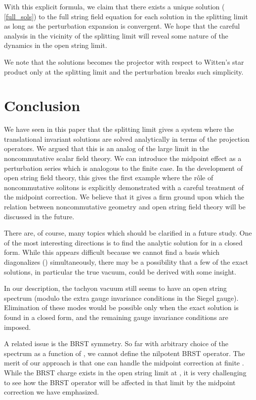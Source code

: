 \documentclass[a4paper,aps,preprint,nofootinbib,eqsecnum]{revtex4}
\begin{document}
With this explicit formula, we claim that there exists a unique solution (%
\ref{full_sols}) to the full string field equation for each solution in the
splitting limit as long as the perturbation expansion is convergent. We hope
that the careful analysis in the vicinity of the splitting limit will reveal
some nature of the dynamics in the open string limit.

We note that the solutions becomes the projector with respect to Witten's
star product \myHighlight{$\star$}\coordHE{} only at the splitting limit and the perturbation breaks
such simplicity.

\section{Conclusion}

We have seen in this paper that the splitting limit gives a system
where the translational invariant solutions are solved
analytically in terms of the projection operators. We argued that
this is an analog of the large \myHighlight{$\theta $}\coordHE{} limit in the
noncommutative scalar field theory. We can introduce the midpoint
effect as a perturbation series which is analogous to the finite
\myHighlight{$\theta $}\coordHE{} case.
In the development of open string field theory, this gives the
first example where the r\^{o}le of noncommutative solitons is
explicitly demonstrated with a careful treatment of the midpoint
correction. We believe that it gives a firm ground upon which the
relation between noncommutative geometry and open string field
theory will be discussed in the future.

There are, of course, many topics which should be clarified in a
future study. One of the most interesting directions is to find
the analytic solution for \coordHE{} in a closed form. While
this appears difficult because we cannot find a basis which
diagonalizes \coordHE{} (\coordHE{}) simultaneously, there may be a
possibility that a few of the exact solutions, in particular the
true vacuum, could be derived with some insight.

In our description, the tachyon vacuum still seems to have an open
string spectrum (modulo the extra gauge invariance conditions in
the Siegel gauge). Elimination of these modes would be possible
only when the exact solution is found in a closed form, and the
remaining gauge invariance conditions are imposed.

A related issue is the BRST symmetry. So far with arbitrary choice
of the spectrum \coordHE{} as a function of \coordHE{}, we cannot
define the nilpotent BRST operator. The merit of our approach is
that one can handle the midpoint correction at finite \coordHE{}. While
the BRST charge exists in the open string limit at \coordHE{}, it is very challenging to see how the BRST operator will
be affected in that limit by the midpoint correction we have
emphasized.
\end{document}

